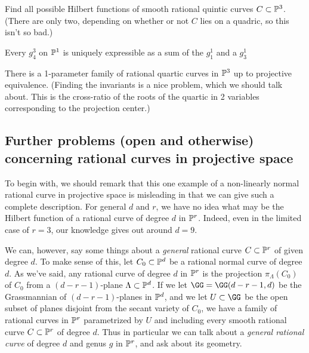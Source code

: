 \begin{exercise}
Find all possible Hilbert functions of smooth rational quintic  curves $C \subset \PP^3$. (There are only two, depending on whether or not $C$ lies on a quadric, so this isn't so bad.)
\end{exercise}

\begin{exercise}
Every $g^3_4$ on $\PP^1$ is uniquely expressible as a sum of the $g_1^1$ and a $g^1_3$
\end{exercise}

\begin{exercise}
There is a 1-parameter family of rational quartic curves in $\PP^3$ up to projective equivalence. (Finding the invariants is a nice problem, which we should talk about. This is the cross-ratio of the roots of the quartic in 2 variables corresponding to the projection center.)
\end{exercise}

\subsection{Further problems (open and otherwise) concerning rational curves in projective space}

To begin with, we should remark that this one example of a non-linearly normal rational curve in projective space is misleading in that we can give such a complete description. For general $d$ and $r$, we have no idea what may be the Hilbert function of a rational curve of degree $d$ in $\PP^r$. Indeed, even in the limited case of $r=3$, our knowledge gives out around $d=9$.

We can, however, say some things about a \emph{general} rational curve $C \subset \PP^r$ of given degree $d$. To make sense of this, let $C_0 \subset \PP^d$ be a rational normal curve of degree $d$. As we've said, any rational curve of degree $d$ in $\PP^r$ is the projection $\pi_\Lambda(C_0)$ of $C_0$ from a $(d-r-1)$-plane $\Lambda \subset \PP^d$. If we let $\GG = \GG(d-r-1, d)$ be the Grassmannian of $(d-r-1)$-planes in $\PP^d$, and we let $U \subset \GG$ be the open subset of planes disjoint from the secant variety of $C_0$, we have a family of rational curves in $\PP^r$ parametrized by $U$ and including every smooth rational curve $C \subset \PP^r$ of degree $d$. Thus in particular we can talk about a \emph{general rational curve} of degree $d$ and genus $g$ in $\PP^r$, and ask about its geometry.

